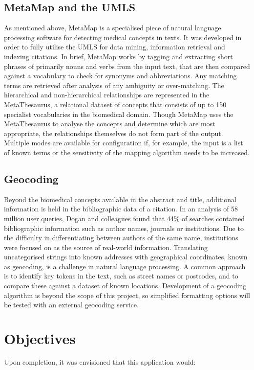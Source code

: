 \documentclass[Report.tex]{subfiles}
\begin{document}
\subsection{MetaMap and the UMLS}
As mentioned above, MetaMap is a specialised piece of natural language processing software for detecting medical concepts in texts. It was developed in order to fully utilise the UMLS for data mining, information retrieval and indexing citations\cite{metamap2000}. In brief, MetaMap works by tagging and extracting short phrases of primarily nouns and verbs from the input text, that are then compared against a vocabulary to check for synonyms and abbreviations. Any matching terms are retrieved after analysis of any ambiguity or over-matching. The hierarchical and non-hierarchical relationships are represented in the MetaThesaurus, a relational dataset of concepts that consists of up to 150 specialist vocabularies in the biomedical domain. Though MetaMap uses the MetaThesaurus to analyse the concepts and determine which are most appropriate, the relationships themselves do not form part of the output. Multiple modes are available for configuration if, for example, the input is a list of known terms or the sensitivity of the mapping algorithm needs to be increased\cite{metamap2010}. 
 
\subsection{Geocoding}
Beyond the biomedical concepts available in the abstract and title, additional information is held in the bibliographic data of a citation. In an analysis of 58 million user queries, Dogan and colleagues found that 44\% of searches contained bibliographic information such as author names, journals or institutions\cite{dogan}. Due to the difficulty in differentiating between authors of the same name, institutions were focused on as the source of real-world information. Translating uncategorised strings into known addresses with geographical coordinates, known as geocoding, is a challenge in natural language processing. A common approach is to identify key tokens in the text, such as street names or postcodes, and to compare these against a dataset of known locations\cite{goldberg2007text}. Development of a geocoding algorithm is beyond the scope of this project, so simplified formatting options will be tested with an external geocoding service.   

\section{Objectives}
Upon completion, it was envisioned that this application would:
\end{document}
